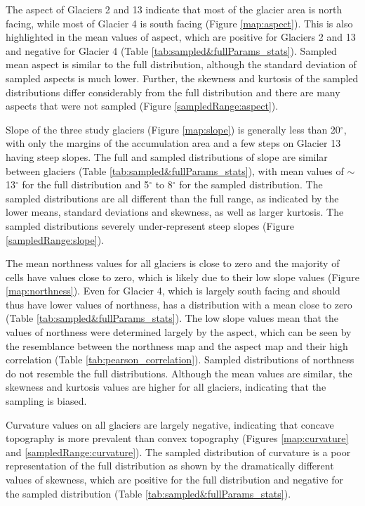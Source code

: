 \documentclass{sfuthesis}
\begin{document}
{The aspect of Glaciers 2 and 13 indicate that most of the glacier area is north facing, while most of Glacier 4 is south facing (Figure \ref{map:aspect}). This is also highlighted in the mean values of aspect, which are positive for Glaciers 2 and 13 and negative for Glacier 4 (Table \ref{tab:sampled&fullParams_stats}). Sampled mean aspect is similar to the full distribution, although the standard deviation of sampled aspects is much lower. Further, the skewness and kurtosis of the sampled distributions differ considerably from the full distribution and there are many aspects that were not sampled (Figure \ref{sampledRange:aspect}). 

Slope of the three study glaciers (Figure \ref{map:slope}) is generally less than 20$^{\circ}$, with only the margins of the accumulation area and a few steps on Glacier 13 having steep slopes. The full and sampled distributions of slope are similar between glaciers (Table \ref{tab:sampled&fullParams_stats}), with mean values of $\sim$13$^{\circ}$ for the full distribution and 5$^{\circ}$ to 8$^{\circ}$ for the sampled distribution. The sampled distributions are all different than the full range, as indicated by the lower means, standard deviations and skewness, as well as larger kurtosis. The sampled distributions severely under-represent steep slopes (Figure \ref{sampledRange:slope}).

The mean northness values for all glaciers is close to zero and the majority of cells have values close to zero, which is likely due to their low slope values (Figure \ref{map:northness}). Even for Glacier 4, which is largely south facing and should thus have lower values of northness, has a distribution with a mean close to zero (Table \ref{tab:sampled&fullParams_stats}). The low slope values mean that the values of northness were determined largely by the aspect, which can be seen by the resemblance between the northness map and the aspect map and their high correlation (Table \ref{tab:pearson_correlation}). Sampled distributions of northness do not resemble the full distributions. Although the mean values are similar, the skewness and kurtosis values are higher for all glaciers, indicating that the sampling is biased.

Curvature values on all glaciers are largely negative, indicating that concave topography is more prevalent than convex topography (Figures \ref{map:curvature} and \ref{sampledRange:curvature}). The sampled distribution of curvature is a poor representation of the full distribution as shown by the dramatically different values of skewness, which are positive for the full distribution and negative for the sampled distribution (Table \ref{tab:sampled&fullParams_stats}). 

}
\end{document}
